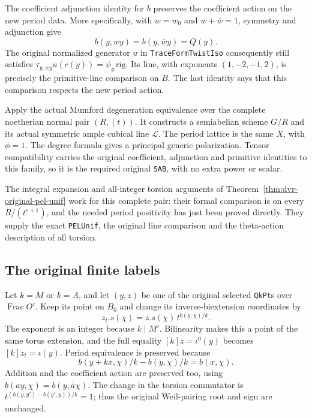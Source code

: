 The coefficient adjunction identity for $b$ preserves the
coefficient action on the new period data.  More specifically,
with $w=w_0$ and $w+\bar w=1$, symmetry and adjunction give
\[
               b(y,wy)=b(y,\bar w y)=Q(y).
\]
The original normalized generator $u$ in
\texttt{TraceFormTwistIso} consequently still satisfies
$\tau_{y,wy}u(c(y))=\psi_y\,\mathrm{rig}$.
Its line, with exponents $(1,-2,-1,2)$, is precisely the
primitive-line comparison on $B$.  The last identity says that
this comparison respects the new period action.

Apply the actual Mumford degeneration equivalence over the
complete noetherian normal pair $(R,(t))$.  It constructs a
semiabelian scheme $G/R$ and its actual symmetric ample cubical
line $\mathscr L$.  The period lattice is the same $X$, with
$\phi=1$.  The degree formula gives a principal generic
polarization.  Tensor compatibility carries the original
coefficient, adjunction and primitive identities to this family,
so it is the required original \texttt{SAB}, with no extra
power or scalar\cite[Theorems 4.2.1.14 and 4.4.16]{formal-arcs-lan}.

The integral expansion and all-integer torsion arguments of
Theorem~\ref{thm:dvr-original-pel-unif} work for this complete
pair: their formal comparison is on every $R/(t^{e+1})$, and
the needed period positivity has just been proved directly.
They supply the exact \texttt{PELUnif}, the original line
comparison and the theta-action description of all torsion.

\subsection*{The original finite labels}

Let $k=M$ or $k=A$, and let $(y,z)$ be one of the original
selected \texttt{QkPt}s over $\operatorname{Frac}O'$.
Keep its point on $B_0$ and change its inverse-biextension
coordinates by
\[
                       z_t.s(\chi)
          =z.s(\chi)\,t^{b(y,\chi)/k}.
\]
The exponent is an integer because $k\mid M'$.
Bilinearity makes this a point of the same torus extension, and
the full equality $[k]z=\iota^0(y)$ becomes
$[k]z_t=\iota(y)$.  Period equivalence is preserved because
\[
     b(y+kx,\chi)/k-b(y,\chi)/k=b(x,\chi).
\]
Addition and the coefficient action are preserved too, using
$b(ay,\chi)=b(y,\bar a\chi)$.
The change in the torsion commutator is
$t^{(b(y,y')-b(y',y))/k}=1$; thus the original Weil-pairing
root and sign are unchanged.

